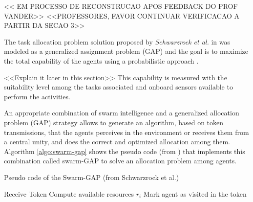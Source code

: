 << EM PROCESSO DE RECONSTRUCAO APOS FEEDBACK DO PROF VANDER>>
<<PROFESSORES, FAVOR CONTINUAR VERIFICACAO A PARTIR DA SECAO 3>>



The task allocation problem solution proposed by \textit{Schwarzrock et al.} in \cite{MAS07} was modeled as a generalized assignment problem (GAP) and the goal is to maximize the total capability of the agents using a probabilistic approach \cite{theraulaz1998response}. 







<<Explain it later in this section>> This capability is measured with the suitability level among the tasks associated and onboard sensors available to perform the activities.




An appropriate combination of swarm intelligence \cite{MOEA07} and a generalized allocation problem (GAP) strategy \cite{ferreira2007swarm} allows to generate an algorithm, based on token transmissions, that the agents perceives in the environment or receives them from a central unity, and does the correct and optimized allocation among them. Algorithm \ref{algo:swarm-gap} shows the pseudo code (from \cite{MAS07}) that implements this combination called swarm-GAP to solve an allocation problem among agents. 

\begin{algorithm}[!ht]
	\SetAlgoLined
	\DontPrintSemicolon
	\SetNlSkip{0.3em}	
	
	\caption{Pseudo code of the Swarm-GAP (from Schwarzrock et al.) }
	\label{algo:swarm-gap}
	Receive Token\; \label{line:receivetoken}
	Compute available resources $r_i $ \; \label{line:compute_r}
	Mark agent as visited in the token\; \label{line:marcavisitado}
\end{algorithm}

